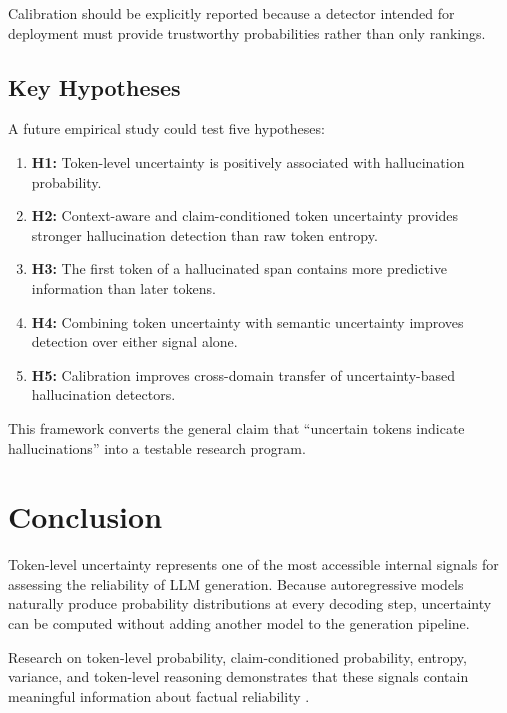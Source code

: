 \documentclass[11pt]{article}
\begin{document}
Calibration should be explicitly reported because a detector intended for deployment must provide trustworthy probabilities rather than only rankings.

\subsection{Key Hypotheses}
\label{sec:hypotheses}

A future empirical study could test five hypotheses:

\begin{enumerate}
    \item \textbf{H1:} Token-level uncertainty is positively associated with hallucination probability.

    \item \textbf{H2:} Context-aware and claim-conditioned token uncertainty provides stronger hallucination detection than raw token entropy.

    \item \textbf{H3:} The first token of a hallucinated span contains more predictive information than later tokens.

    \item \textbf{H4:} Combining token uncertainty with semantic uncertainty improves detection over either signal alone.

    \item \textbf{H5:} Calibration improves cross-domain transfer of uncertainty-based hallucination detectors.
\end{enumerate}

This framework converts the general claim that ``uncertain tokens indicate hallucinations'' into a testable research program.

\section{Conclusion}
\label{sec:conclusion}

Token-level uncertainty represents one of the most accessible internal signals for assessing the reliability of LLM generation. Because autoregressive models naturally produce probability distributions at every decoding step, uncertainty can be computed without adding another model to the generation pipeline.

Research on token-level probability, claim-conditioned probability, entropy, variance, and token-level reasoning demonstrates that these signals contain meaningful information about factual reliability \cite{fadeeva2024,quevedo2025,zhang2025}.
\end{document}
